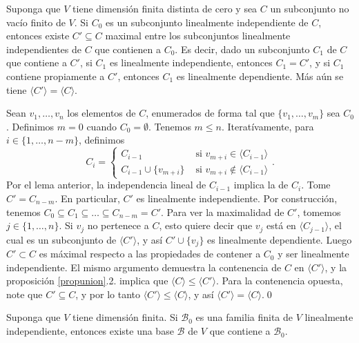 \begin{prop}\label{maximallinind}
Suponga que $V$ tiene dimensi\'on finita distinta de cero y sea $C$ un subconjunto no vacío finito de $V$. Si $C_0$ es un subconjunto linealmente independiente de $C$, entonces existe $C'\subseteq C$ maximal entre los subconjuntos linealmente independientes de $C$ que contienen a $C_0$. Es decir, dado un subconjunto $C_1$ de $C$ que contiene a $C'$, si $C_1$ es linealmente independiente, entonces $C_1=C'$, y si $C_1$ contiene propiamente a $C'$, entonces $C_1$ es linealmente dependiente. M\'as a\'un se tiene $\langle C'\rangle=\langle C\rangle$.  
\end{prop}

\dem Sean $v_1,\ldots,v_n$ los elementos de $C$, enumerados de forma tal que $\{v_1,\ldots,v_m\}$ sea $C_0$. Definimos $m=0$ cuando $C_0=\emptyset$. Tenemos $m\le n$. Iteratívamente, para $i\in\{1,\ldots,n-m\}$, definimos
$$
C_i = \left\{ \begin{array}{rl}
C_{i-1}&\textrm{ si } v_{m+i}\in\langle C_{i-1}\rangle\\
C_{i-1}\cup\{v_{m+i}\} &\textrm{ si } v_{m+i}\not\in\langle C_{i-1}\rangle
\end{array}\right. .
$$
Por el lema anterior, la independencia lineal de $C_{i-1}$ implica la de $C_i$. Tome $C'=C_{n-m}$. En particular, $C'$ es linealmente independiente. Por construcci\'on, tenemos $C_0\subseteq C_1\subseteq\ldots\subseteq C_{n-m}= C'$. Para ver la maximalidad de $C'$, tomemos $j\in\{1,\ldots,n\}$. Si $v_j$ no pertenece a $C$, esto quiere decir que $v_j$ est\'a en $\langle C_{j-1}\rangle$, el cual es un subconjunto de $\langle C'\rangle$, y as\'i $C'\cup\{v_j\}$ es linealmente dependiente. Luego $C'\subset C$ es m\'aximal respecto a las propiedades de contener a $C_0$ y ser linealmente independiente. El mismo argumento demuestra la contenencia de $C$ en $\langle C'\rangle$, y la proposici\'on \ref{propunion}.2. implica que $\langle C\rangle\le\langle C'\rangle$. Para la contenencia opuesta, note que $C'\subseteq C$, y por lo tanto $\langle C'\rangle\le\langle C\rangle$, y así $\langle C'\rangle=\langle C\rangle$.\qed

\begin{teo}\label{extabase}
Suponga que $V$ tiene dimensi\'on finita. Si $\mathcal{B}_0$ es una familia finita de $V$ linealmente independiente, entonces existe una base $\mathcal{B}$ de $V$ que contiene a $\mathcal{B}_0$.
\end{teo}

